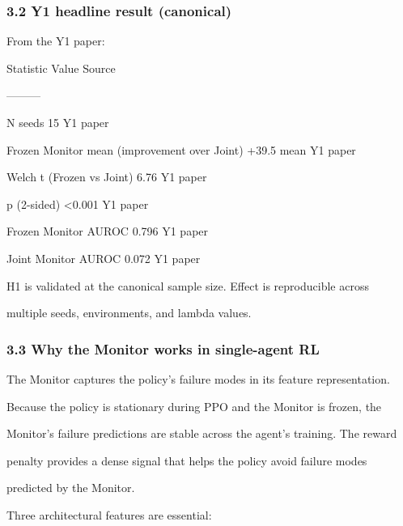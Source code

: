 \documentclass[
]{article}
\begin{document}
\subsubsection{3.2 Y1 headline result
(canonical)}\label{y1-headline-result-canonical}

From the Y1 paper:

Statistic \textbar{} Value \textbar{} Source \textbar{}

\textbar---\textbar---\textbar---\textbar{}

N seeds \textbar{} 15 \textbar{} Y1 paper \textbar{}

Frozen Monitor mean (improvement over Joint) \textbar{} +39.5 mean
\textbar{} Y1 paper \textbar{}

Welch t (Frozen vs Joint) \textbar{} 6.76 \textbar{} Y1 paper \textbar{}

p (2-sided) \textbar{} \textless0.001 \textbar{} Y1 paper \textbar{}

Frozen Monitor AUROC \textbar{} 0.796 \textbar{} Y1 paper \textbar{}

Joint Monitor AUROC \textbar{} 0.072 \textbar{} Y1 paper \textbar{}

H1 is validated at the canonical sample size. Effect is reproducible
across

multiple seeds, environments, and lambda values.

\subsubsection{3.3 Why the Monitor works in single-agent
RL}\label{why-the-monitor-works-in-single-agent-rl}

The Monitor captures the policy's failure modes in its feature
representation.

Because the policy is stationary during PPO and the Monitor is frozen,
the

Monitor's failure predictions are stable across the agent's training.
The reward

penalty provides a dense signal that helps the policy avoid failure
modes

predicted by the Monitor.

Three architectural features are essential:
\end{document}
